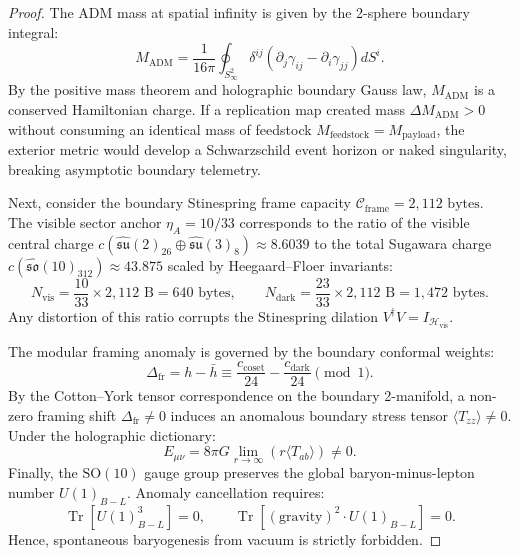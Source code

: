 \documentclass[11pt,onecolumn]{article}
\DeclareMathOperator{\Tr}{Tr}
\begin{document}
\begin{proof}
The ADM mass at spatial infinity is given by the 2-sphere boundary integral:
\begin{equation}
M_{\text{ADM}} = \frac{1}{16\pi} \oint_{S_\infty^2} \delta^{ij} \left( \partial_j \gamma_{ij} - \partial_i \gamma_{jj} \right) dS^i.
\end{equation}
By the positive mass theorem and holographic boundary Gauss law, $M_{\text{ADM}}$ is a conserved Hamiltonian charge. If a replication map created mass $\Delta M_{\text{ADM}} > 0$ without consuming an identical mass of feedstock $M_{\text{feedstock}} = M_{\text{payload}}$, the exterior metric would develop a Schwarzschild event horizon or naked singularity, breaking asymptotic boundary telemetry.

Next, consider the boundary Stinespring frame capacity $\mathcal{C}_{\text{frame}} = 2{,}112\text{ bytes}$. The visible sector anchor $\eta_A = 10/33$ corresponds to the ratio of the visible central charge $c(\hat{\mathfrak{su}}(2)_{26} \oplus \hat{\mathfrak{su}}(3)_8) \approx 8.6039$ to the total Sugawara charge $c(\hat{\mathfrak{so}}(10)_{312}) \approx 43.875$ scaled by Heegaard--Floer invariants:
\begin{equation}
N_{\text{vis}} = \frac{10}{33} \times 2{,}112\text{ B} = 640\text{ bytes}, \qquad N_{\text{dark}} = \frac{23}{33} \times 2{,}112\text{ B} = 1{,}472\text{ bytes}.
\end{equation}
Any distortion of this ratio corrupts the Stinespring dilation $V^\dagger V = I_{\mathcal{H}_{\text{vis}}}$.

The modular framing anomaly is governed by the boundary conformal weights:
\begin{equation}
\Delta_{\text{fr}} = h - \bar{h} \equiv \frac{c_{\text{coset}}}{24} - \frac{c_{\text{dark}}}{24} \pmod 1.
\end{equation}
By the Cotton--York tensor correspondence on the boundary 2-manifold, a non-zero framing shift $\Delta_{\text{fr}} \neq 0$ induces an anomalous boundary stress tensor $\langle T_{zz} \rangle \neq 0$. Under the holographic dictionary:
\begin{equation}
E_{\mu\nu} = 8\pi G \lim_{r \to \infty} \left( r \langle T_{ab} \rangle \right) \neq 0.
\end{equation}
Finally, the $\text{SO}(10)$ gauge group preserves the global baryon-minus-lepton number $U(1)_{B-L}$. Anomaly cancellation requires:
\begin{equation}
\Tr\left[ U(1)_{B-L}^3 \right] = 0, \qquad \Tr\left[ (\text{gravity})^2 \cdot U(1)_{B-L} \right] = 0.
\end{equation}
Hence, spontaneous baryogenesis from vacuum is strictly forbidden.
\end{proof}
\end{document}
